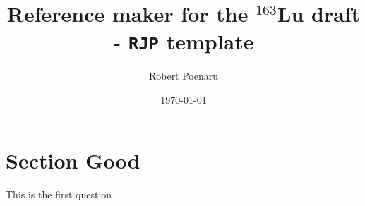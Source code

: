 \documentclass[12pt, oneside]{article}   	%
\title{Reference maker for the $^{163}$Lu draft - \texttt{RJP} template}
\author{Robert Poenaru}
\date{\today}							%
\begin{document}
\maketitle
\section{Section Good}

This is the first question \cite{chen2020interpretation}.


\lipsum[1]


\end{document}
